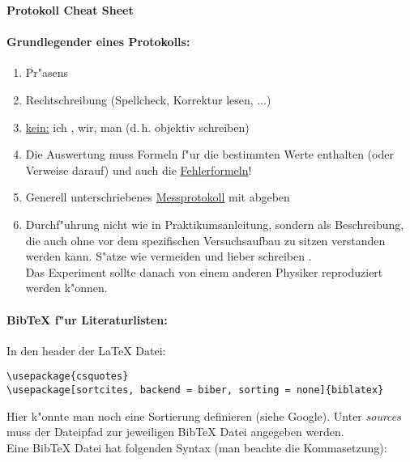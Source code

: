\documentclass[11pt, a4paper]{article}
\begin{document}
	{\bf \sc \Large Protokoll Cheat Sheet}

	\paragraph{Grundlegender  eines Protokolls:}
	\begin{enumerate}[label=(\roman*)]
		\item Pr"asens
		\item Rechtschreibung (Spellcheck, Korrektur lesen, $\ldots$)
        \item \underline{kein:} ich , wir, man (d.\,h. objektiv schreiben)
		\item Die Auswertung muss Formeln f"ur die bestimmten Werte enthalten (oder Verweise darauf) und auch die \underline{Fehlerformeln}!
		\item Generell unterschriebenes \underline{Messprotokoll} mit abgeben
		\item Durchf"uhrung nicht wie in Praktikumsanleitung, sondern als Beschreibung, die auch ohne vor dem spezifischen Versuchsaufbau zu sitzen verstanden werden kann. S"atze wie  vermeiden und lieber schreiben .\\ Das Experiment sollte danach von einem anderen Physiker reproduziert werden k"onnen.
	\end{enumerate}

	\paragraph{Bib\TeX{} f"ur Literaturlisten:}
	In den header der \LaTeX{} Datei:
	\begin{verbatim}
\usepackage{csquotes}
\usepackage[sortcites, backend = biber, sorting = none]{biblatex}

	\end{verbatim}
	Hier k"onnte man noch eine Sortierung definieren (siehe Google). Unter \emph{sources} muss der Dateipfad zur jeweiligen Bib\TeX{} Datei angegeben werden.\\
    Eine Bib\TeX{} Datei hat folgenden Syntax (man beachte die Kommasetzung):
    \inputminted{tex}{sources.bib}
\end{document}
